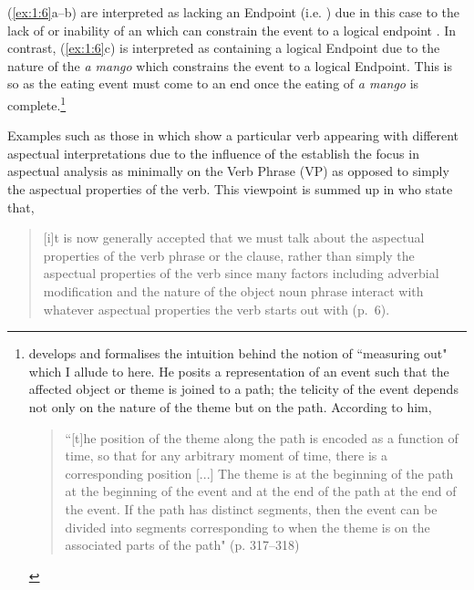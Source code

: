 (\ref{ex:1:6}a--b) are interpreted as lacking an Endpoint (i.e. ) due in
this case to the lack of or inability of an  which can
constrain the event to a logical endpoint \citep[cf.][]{Tenny1994}.  In
contrast, (\ref{ex:1:6}c) is interpreted as containing a logical Endpoint due to
the nature of the  \textit{a mango} which constrains the event to a
logical Endpoint. This is so as the eating event must come to an end once the
eating of \textit{a mango} is complete.\footnote{\citet{Jackendoff1996} develops and
  formalises the intuition behind the notion of  ``measuring out"
  \citep{Tenny1994} which I allude to here. He posits a representation of an
  event such that the affected object or theme is joined to a path; the telicity
  of the event depends not only on the nature of the theme but on the path.
  According to him,
  
  \begin{quote} ``[t]he position of the theme along the path is encoded as a
  function of time, so that for any arbitrary moment of time, there is a
  corresponding position [...] The theme is at the beginning of the path at the
  beginning of the event and at the end of the path at the end of the event. If
  the path has distinct segments, then the event can be divided into segments
corresponding to when the theme is on the associated parts of the path" (p. 317--318)\end{quote}}

Examples such as those in  which show a particular verb
appearing with different aspectual interpretations due to the
influence of the  establish the focus in aspectual
analysis as minimally on the Verb Phrase (VP) as opposed to simply the
aspectual properties of the verb. This viewpoint is summed up in 
\citet{TennyPustejovsky2000} who state that,

\begin{quote}
[i]t is now generally accepted that we must talk about the aspectual
properties of the verb phrase or the clause, rather than simply the
aspectual properties of the verb since many factors including
adverbial modification and the nature of the object noun phrase
interact with whatever aspectual properties the verb starts out
with (p.~6).
\end{quote}

